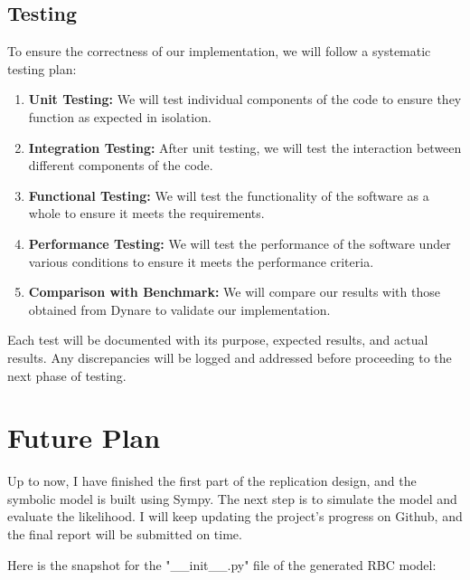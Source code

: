 \documentclass[12pt]{article}
\begin{document}
\subsection*{Testing}

To ensure the correctness of our implementation, we will follow a systematic testing plan:

\begin{enumerate}
    \item \textbf{Unit Testing:} We will test individual components of the code to ensure they function as expected in isolation.
    \item \textbf{Integration Testing:} After unit testing, we will test the interaction between different components of the code.
    \item \textbf{Functional Testing:} We will test the functionality of the software as a whole to ensure it meets the requirements.
    \item \textbf{Performance Testing:} We will test the performance of the software under various conditions to ensure it meets the performance criteria.
    \item \textbf{Comparison with Benchmark:} We will compare our results with those obtained from Dynare to validate our implementation.
\end{enumerate}

Each test will be documented with its purpose, expected results, and actual results. Any discrepancies will be logged and addressed before proceeding to the next phase of testing.

\section{Future Plan}

Up to now, I have finished the first part of the replication design, and the symbolic model is built using Sympy. The next step is to simulate the model and evaluate the likelihood. I will keep updating the project's progress on Github, and the final report will be submitted on time.

Here is the snapshot for the "\_\_init\_\_.py" file of the generated RBC model:



\end{document}
